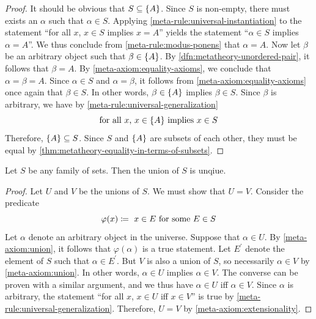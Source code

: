 \begin{proof}
    It should be obvious that \( S \subseteq \mleft\{ A \mright\} \).
    Since \( S \) is non-empty, there must exists an \( \alpha \) such that \( \alpha \in S \).
    Applying \cref{meta-rule:universal-instantiation} to the statement ``for all \( x \), \( x \in S \) implies \( x = A \)''
    yields the statement ``\( \alpha \in S \) implies \( \alpha = A \)''.
    We thus conclude from \cref{meta-rule:modus-ponens} that \( \alpha = A \).
    Now let \( \beta \) be an arbitrary object such that \( \beta \in \mleft\{ A \mright\} \).
    By \cref{dfn:metatheory-unordered-pair}, it follows that \( \beta = A \).
    By \cref{meta-axiom:equality-axioms}, we conclude that \( \alpha = \beta = A \).
    Since \( \alpha \in S \) and \( \alpha = \beta \), it follows from \cref{meta-axiom:equality-axioms} once again that \( \beta \in S \).
    In other words, \( \beta \in \mleft\{ A \mright\} \) implies \( \beta \in S \).
    Since \( \beta \) is arbitrary, we have by \cref{meta-rule:universal-generalization}
    \begin{equation*}
        \text{for all \( x \), \( x \in \mleft\{ A \mright\} \) implies \( x \in S \)}
    \end{equation*}
    Therefore, \( \mleft\{ A \mright\} \subseteq S \).
    Since \( S \) and \( \mleft\{ A \mright\} \) are subsets of each other, they must be equal by \cref{thm:metatheory-equality-in-terms-of-subsets}.
\end{proof}

\begin{thm}
     \label{thm:metatheory-uniqueness-of-union}
    Let \( S \) be any family of sets. Then the union of \( S \) is unqiue.
\end{thm}

\begin{proof}
    Let \( U \) and \( V \) be the unions of \( S \). We must show that \( U = V \). Consider the predicate
    \begin{equation*}
        \varphi(x) \coloneq \ \text{\( x \in E \) for some \( E \in S \)}
    \end{equation*}
    Let \( \alpha \) denote an arbitrary object in the universe. Suppose that \( \alpha \in U \).
    By \cref{meta-axiom:union}, it follows that \( \varphi(\alpha) \) is a true statement.
    Let \( E^{\prime} \) denote the element of \( S \) such that \( \alpha \in E^{\prime} \).
    But \( V \) is also a union of \( S \), so necessarily \( \alpha \in V \) by \cref{meta-axiom:union}.
    In other words, \( \alpha \in U \) implies \( \alpha \in V \).
    The converse can be proven with a similar argument, and we thus have \( \alpha \in U \) iff \( \alpha \in V \).
    Since \( \alpha \) is arbitrary, the statement ``for all \( x \), \( x \in U \) iff \( x \in V \)'' is true by
    \cref{meta-rule:universal-generalization}.
    Therefore, \( U = V \) by \cref{meta-axiom:extensionality}.
\end{proof}

